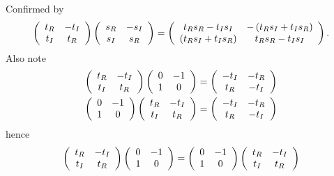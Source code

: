 \documentclass[aps,preprint]{revtex4}%
\begin{document}
Confirmed by
\begin{equation}
\left(
\begin{array}
[c]{cc}%
t_{R} & -t_{I}\\
t_{I} & t_{R}%
\end{array}
\right)  \left(
\begin{array}
[c]{cc}%
s_{R} & -s_{I}\\
s_{I} & s_{R}%
\end{array}
\right)  =\left(
\begin{array}
[c]{cc}%
t_{R}s_{R}-t_{I}s_{I} & -\left(  t_{R}s_{I}+t_{I}s_{R}\right) \\
\left(  t_{R}s_{I}+t_{I}s_{R}\right)  & t_{R}s_{R}-t_{I}s_{I}%
\end{array}
\right)  .
\end{equation}
Also note
\begin{align}
\left(
\begin{array}
[c]{cc}%
t_{R} & -t_{I}\\
t_{I} & t_{R}%
\end{array}
\right)  \left(
\begin{array}
[c]{cc}%
0 & -1\\
1 & 0
\end{array}
\right)   &  =\left(
\begin{array}
[c]{cc}%
-t_{I} & -t_{R}\\
t_{R} & -t_{I}%
\end{array}
\right) \\
\left(
\begin{array}
[c]{cc}%
0 & -1\\
1 & 0
\end{array}
\right)  \left(
\begin{array}
[c]{cc}%
t_{R} & -t_{I}\\
t_{I} & t_{R}%
\end{array}
\right)   &  =\left(
\begin{array}
[c]{cc}%
-t_{I} & -t_{R}\\
t_{R} & -t_{I}%
\end{array}
\right)
\end{align}
hence
\begin{equation}
\left(
\begin{array}
[c]{cc}%
t_{R} & -t_{I}\\
t_{I} & t_{R}%
\end{array}
\right)  \left(
\begin{array}
[c]{cc}%
0 & -1\\
1 & 0
\end{array}
\right)  =\left(
\begin{array}
[c]{cc}%
0 & -1\\
1 & 0
\end{array}
\right)  \left(
\begin{array}
[c]{cc}%
t_{R} & -t_{I}\\
t_{I} & t_{R}%
\end{array}
\right)
\end{equation}
\end{document}
